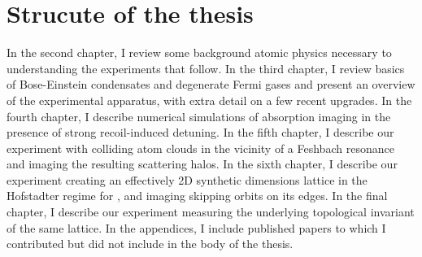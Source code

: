 \section{Strucute of the thesis}
In the second chapter, I review some background atomic physics necessary to understanding the experiments that follow. In the third chapter, I review basics of Bose-Einstein condensates and degenerate Fermi gases and present an overview of the experimental apparatus, with extra detail on a few recent upgrades. In the fourth chapter, I describe numerical simulations of absorption imaging in the presence of strong recoil-induced detuning. In the fifth chapter, I describe our experiment with colliding \K{} atom clouds in the vicinity of a Feshbach resonance and imaging the resulting \swave{} scattering halos. In the sixth chapter, I describe our experiment creating an effectively 2D synthetic dimensions lattice in the Hofstadter regime for \Rb{}, and imaging skipping orbits on its edges. In the final chapter, I describe our experiment measuring the underlying topological invariant of the same lattice. In the appendices, I include published papers to which I contributed but did not include in the body of the thesis.  
